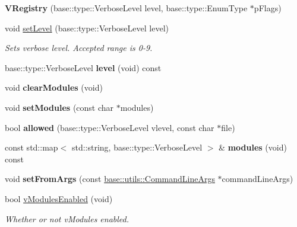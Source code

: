 \begin{DoxyCompactItemize}
\item 
\hypertarget{a00094_ac4b36d32d3722238024480ce66c52ad0}{}{\bfseries V\+Registry} (base\+::type\+::\+Verbose\+Level level, base\+::type\+::\+Enum\+Type $\ast$p\+Flags)\label{a00094_ac4b36d32d3722238024480ce66c52ad0}

\item 
\hypertarget{a00094_aea4fb84a03363080ee2501193084f71f}{}void \hyperlink{a00094_aea4fb84a03363080ee2501193084f71f}{set\+Level} (base\+::type\+::\+Verbose\+Level level)\label{a00094_aea4fb84a03363080ee2501193084f71f}

\begin{DoxyCompactList}\small\item\em Sets verbose level. Accepted range is 0-\/9. \end{DoxyCompactList}\item 
\hypertarget{a00094_ad68e225738ecde9a5a59e9fcdfdcc1b9}{}base\+::type\+::\+Verbose\+Level {\bfseries level} (void) const \label{a00094_ad68e225738ecde9a5a59e9fcdfdcc1b9}

\item 
\hypertarget{a00094_a52de90db82e57827ac3d3994f70c17cf}{}void {\bfseries clear\+Modules} (void)\label{a00094_a52de90db82e57827ac3d3994f70c17cf}

\item 
\hypertarget{a00094_a65e202cc547cd11231d3ea0fb70765d0}{}void {\bfseries set\+Modules} (const char $\ast$modules)\label{a00094_a65e202cc547cd11231d3ea0fb70765d0}

\item 
\hypertarget{a00094_a13b725e3da8935fce5cf3c16fd3a2ff9}{}bool {\bfseries allowed} (base\+::type\+::\+Verbose\+Level vlevel, const char $\ast$file)\label{a00094_a13b725e3da8935fce5cf3c16fd3a2ff9}

\item 
\hypertarget{a00094_abc23bea6b9f2884caa6d5aadc8769892}{}const std\+::map$<$ std\+::string, base\+::type\+::\+Verbose\+Level $>$ \& {\bfseries modules} (void) const \label{a00094_abc23bea6b9f2884caa6d5aadc8769892}

\item 
\hypertarget{a00094_a811e62d7d016a0714b4363f47216a9da}{}void {\bfseries set\+From\+Args} (const \hyperlink{a00009}{base\+::utils\+::\+Command\+Line\+Args} $\ast$command\+Line\+Args)\label{a00094_a811e62d7d016a0714b4363f47216a9da}

\item 
\hypertarget{a00094_ad7a8e939daf6b3d6b949def0a9f65a1f}{}bool \hyperlink{a00094_ad7a8e939daf6b3d6b949def0a9f65a1f}{v\+Modules\+Enabled} (void)\label{a00094_ad7a8e939daf6b3d6b949def0a9f65a1f}

\begin{DoxyCompactList}\small\item\em Whether or not v\+Modules enabled. \end{DoxyCompactList}\end{DoxyCompactItemize}
